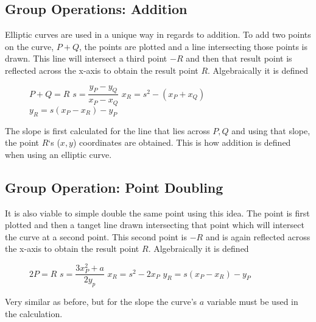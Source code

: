 \documentclass[conference]{IEEEtran}
\begin{document}
\subsection{Group Operations: Addition}
Elliptic curves are used in a unique way in regards to addition. To add two points on the curve, $P + Q$, the points are plotted and a line intersecting those points is drawn. This line will intersect a third point $-R$ and then that result point is reflected across the x-axis to obtain the result point $R$. Algebraically it is defined

\begin{figure}[h]
	\begin{center}
		$P + Q = R$ \newline
		$s = \dfrac{y_P - y_Q}{x_P - x_Q}$ \newline
		$x_R = s^2 - (x_P + x_Q)$ \newline
		$y_R = s(x_P - x_R) - y_P$ \newline
	\end{center}
\end{figure}

The slope is first calculated for the line that lies across $P, Q$ and using that slope, the point $R$`s ($x, y$) coordinates are obtained. This is how addition is defined when using an elliptic curve.

\subsection{Group Operation: Point Doubling}
It is also viable to simple double the same point using this idea. The point is first plotted and then a tanget line drawn intersecting that point which will intersect the curve at a second point. This second point is $-R$ and is again reflected across the x-axis to obtain the result point $R$. Algebraically it is defined

\begin{figure}[h]
	\begin{center}
		$2P = R$ \newline
		$s = \dfrac{3x_P^2 + a}{2y_p}$ \newline
		$x_R = s^2 - 2x_P$ \newline
		$y_R = s(x_P - x_R) - y_P$ \newline
	\end{center}
\end{figure}

Very similar as before, but for the slope the curve's $a$ variable must be used in the calculation.
\end{document}
